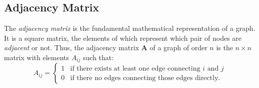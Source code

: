 \subsection{Adjacency Matrix}
\begin{definition}
  The \textit{adjacency matrix} is the fundamental mathematical representation of a graph.
  It is a square matrix, the elements of which represent which pair of nodes are
  \textit{adjacent} or not. Thus, the adjacency matrix \textbf{A} of a graph of order $n$
  is the $n\times n$ matrix with elements $A_{ij}$ such that:
  \begin{equation}
    \label{eq:adj_mat}
    A_{ij} = \begin{cases} 1 &\text{if there exists at least one edge connecting $i$ and $j$} \\
               0 &\text{if there no edges connecting those edges directly.}

             \end{cases}
\end{equation}
\end{definition}



